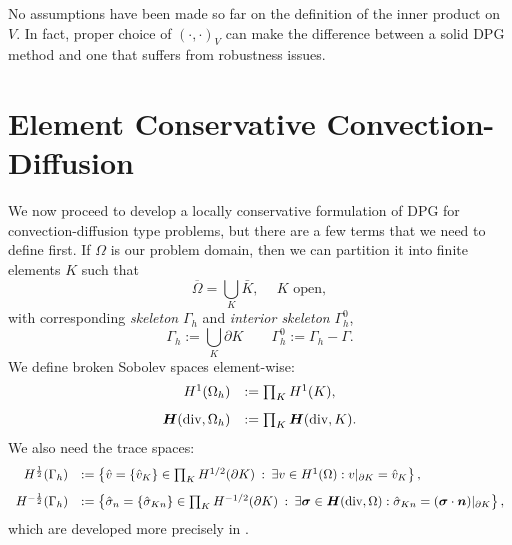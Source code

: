 \documentclass[letterpaper]{article}
\newcommand{\LRp}[1]{\left( #1 \right)}
\newcommand{\ptl}{{\partial}}
\newcommand{\bfsig}{\mbox{\boldmath $\sigma$}}
\newcommand{\bfn}{\mbox{\boldmath $n$}}
\newcommand{\bfH}{\mbox{\boldmath $H$}}
\begin{document}
No assumptions have been made so far on the definition of the inner product on
$V$. In fact, proper choice of $\LRp{\cdot,\cdot}_V$ can make the difference
between a solid DPG method and one that suffers from robustness issues.

\section{Element Conservative Convection-Diffusion}
We now proceed to develop a locally conservative formulation of DPG for
convection-diffusion type problems, but there are a few terms that we need to
define first. If $\Omega$ is our problem domain, then we can partition it into
finite elements $K$ such that
\[
\overline{\Omega} = \bigcup_K  \bar{K},\: \quad K \text { open},
\]
with corresponding {\em skeleton} $\Gamma_h$ and {\em interior
  skeleton} $\Gamma_h^0$,
\[
\Gamma_h := \bigcup_K \partial K\qquad \Gamma_h^0 := \Gamma_h - \Gamma.
\]
We define broken Sobolev spaces element-wise:
\[
\begin{array}{rl}
H^1(\Omega_h) & := \prod_K H^1(K), \\[8pt]
\bfH(\text{div},\Omega_h) & := \prod_K \bfH(\text{div},K).
\end{array}
\]
We also need the trace spaces:
\[
\begin{array}{rl}
H^\frac{1}{2}(\Gamma_h) & := \left\{ \hat{v} = \{\hat{v}_K \} \in \prod_K H^{1/2}(\ptl K) \: :
\: \exists v \in H^1(\Omega) : v|_{\ptl K} = \hat{v}_K \right\}, \\[8pt]
H^{-\frac{1}{2}}(\Gamma_h) & := \left\{ {\hat{\sigma}}_n = \{ {\hat{\sigma}}_{Kn} \}\in \prod_K H^{-1/2}(\ptl K) \: : \: \exists \bfsig \in \bfH(\text{div},\Omega)
: {\hat{\sigma}}_{Kn} = (\bfsig \cdot \bfn)|_{\ptl K} \right\},
\end{array}
\]
which are developed more precisely in \cite{DPGStokes}.
\end{document}

